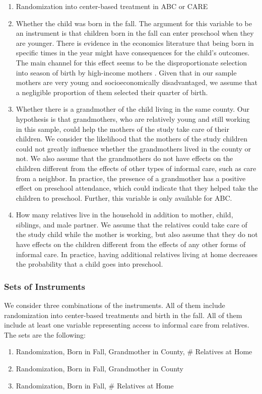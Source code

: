 \begin{appendices}
\begin{enumerate}
\item Randomization into center-based treatment in ABC or CARE
\item Whether the child was born in the fall. The argument for this variable to be an instrument is that children born in the fall can enter preschool when they are younger. There is evidence in the economics literature that being born in specific times in the year might have consequences for the child's outcomes. The main channel for this effect seems to be the disproportionate selection into season of birth by high-income mothers \citep{Buckles-Hungerman_2013_RES}. Given that in our sample mothers are very young and socioeconomically disadvantaged, we assume that a negligible proportion of them selected their quarter of birth.
\item Whether there is a grandmother of the child living in the same county. Our hypothesis is that grandmothers, who are relatively young and still working in this sample, could help the mothers of the study take care of their children. We consider the likelihood that the mothers of the study children could not greatly influence whether the grandmothers lived in the county or not. We also assume that the grandmothers do not have effects on the children different from the effects of other types of informal care, such as care from a neighbor. In practice, the presence of a grandmother has a positive effect on preschool attendance, which could indicate that they helped take the children to preschool. Further, this variable is only available for ABC.
\item How many relatives live in the household in addition to mother, child, siblings, and male partner. We assume that the relatives could take care of the study child while the mother is working, but also assume that they do not have effects on the children different from the effects of any other forms of informal care. In practice, having additional relatives living at home decreases the probability that a child goes into preschool.
\end{enumerate}

\subsubsection{Sets of Instruments}
\noindent We consider three combinations of the instruments.  All of them include randomization into center-based treatments and birth in the fall. All of them include at least one variable representing access to informal care from relatives. The sets are the following:
\begin{enumerate}
\item Randomization, Born in Fall, Grandmother in County, \# Relatives at Home
\item Randomization, Born in Fall, Grandmother in County
\item Randomization, Born in Fall, \# Relatives at Home
\end{enumerate}


\end{appendices}
